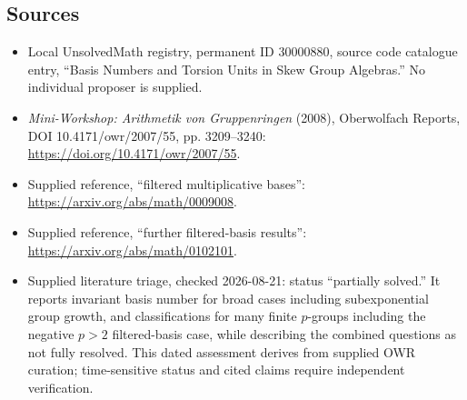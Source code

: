 \documentclass[11pt]{article}
\begin{document}
\subsection{Sources}
\begin{itemize}
\item Local UnsolvedMath registry, permanent ID \(30000880\), source code catalogue entry, ``Basis Numbers and Torsion Units in Skew Group Algebras.'' No individual proposer is supplied.
\item \emph{Mini-Workshop: Arithmetik von Gruppenringen} (2008), Oberwolfach Reports, DOI 10.4171/owr/2007/55, pp. 3209--3240: \url{https://doi.org/10.4171/owr/2007/55}.
\item Supplied reference, ``filtered multiplicative bases'': \url{https://arxiv.org/abs/math/0009008}.
\item Supplied reference, ``further filtered-basis results'': \url{https://arxiv.org/abs/math/0102101}.
\item Supplied literature triage, checked 2026-08-21: status ``partially solved.'' It reports invariant basis number for broad cases including subexponential group growth, and classifications for many finite \(p\)-groups including the negative \(p>2\) filtered-basis case, while describing the combined questions as not fully resolved. This dated assessment derives from supplied OWR curation; time-sensitive status and cited claims require independent verification.
\end{itemize}
\end{document}
